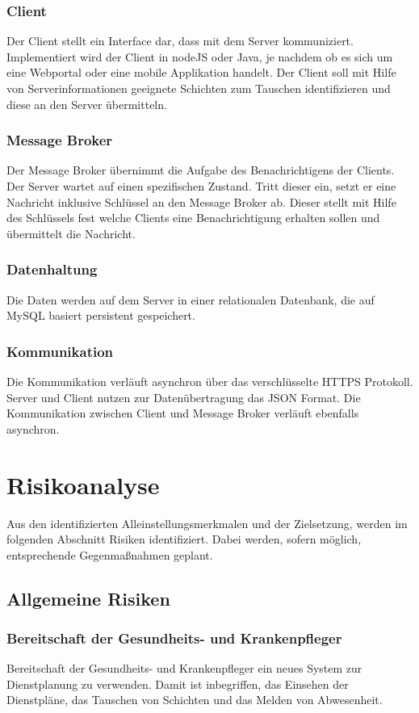 \documentclass[10pt,a4paper]{article}
\begin{document}
\subsubsection{Client}
Der Client stellt ein Interface dar, dass mit dem Server kommuniziert. Implementiert wird der Client in nodeJS oder Java, je nachdem ob es sich um eine Webportal oder eine mobile Applikation handelt.
Der Client soll mit Hilfe von Serverinformationen geeignete Schichten zum Tauschen identifizieren und diese an den Server übermitteln.
\subsubsection{Message Broker}
Der Message Broker übernimmt die Aufgabe des Benachrichtigens der Clients. Der Server wartet auf einen spezifischen Zustand. Tritt dieser ein, setzt er eine Nachricht inklusive Schlüssel an den Message Broker ab. Dieser stellt mit Hilfe des Schlüssels fest welche Clients eine Benachrichtigung erhalten sollen und übermittelt die Nachricht.
\subsubsection{Datenhaltung}
Die Daten werden auf dem Server in einer relationalen Datenbank, die auf MySQL basiert persistent gespeichert.
\subsubsection{Kommunikation}
Die Kommunikation verläuft asynchron über das verschlüsselte HTTPS Protokoll. Server und Client nutzen zur Datenübertragung das JSON Format. Die Kommunikation zwischen Client und Message Broker verläuft ebenfalls asynchron.
\section{Risikoanalyse}
Aus den identifizierten Alleinstellungsmerkmalen und der Zielsetzung, werden im folgenden Abschnitt Risiken identifiziert. Dabei werden, sofern möglich, entsprechende Gegenmaßnahmen geplant.
\subsection{Allgemeine Risiken}
\subsubsection{Bereitschaft der Gesundheits- und Krankenpfleger}
Bereitschaft der Gesundheits- und Krankenpfleger ein neues System zur Dienstplanung zu verwenden. Damit ist inbegriffen, das Einsehen der Dienstpläne, das Tauschen von Schichten und das Melden von Abwesenheit.
\end{document}
